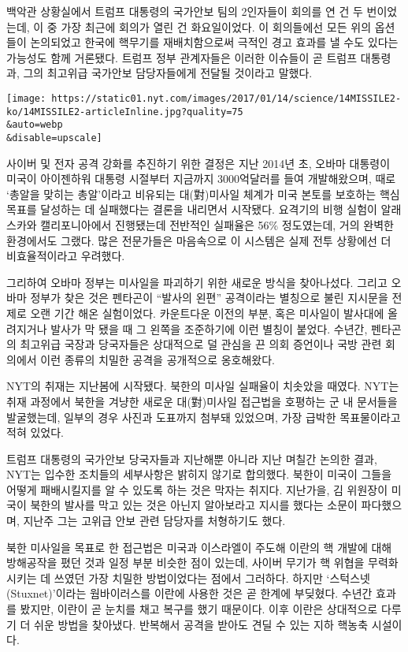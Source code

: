 백악관 상황실에서 트럼프 대통령의 국가안보 팀의 2인자들이 회의를 연 건
두 번이었는데, 이 중 가장 최근에 회의가 열린 건 화요일이었다. 이
회의들에선 모든 위의 옵션들이 논의되었고 한국에 핵무기를 재배치함으로써
극적인 경고 효과를 낼 수도 있다는 가능성도 함께 거론됐다. 트럼프 정부
관계자들은 이러한 이슈들이 곧 트럼프 대통령과, 그의 최고위급 국가안보
담당자들에게 전달될 것이라고 말했다.

\texttt{[image: https://static01.nyt.com/images/2017/01/14/science/14MISSILE2-ko/14MISSILE2-articleInline.jpg?quality=75\\\&auto=webp\\\&disable=upscale]}

사이버 및 전자 공격 강화를 추진하기 위한 결정은 지난 2014년 초, 오바마
대통령이 미국이 아이젠하워 대통령 시절부터 지금까지 3000억달러를 들여
개발해왔으며, 때로 `총알을 맞히는 총알'이라고 비유되는 대(對)미사일
체계가 미국 본토를 보호하는 핵심 목표를 달성하는 데 실패했다는 결론을
내리면서 시작됐다. 요격기의 비행 실험이 알래스카와 캘리포니아에서
진행됐는데 전반적인 실패율은 56\% 정도였는데, 거의 완벽한 환경에서도
그랬다. 많은 전문가들은 마음속으로 이 시스템은 실제 전투 상황에선 더
비효율적이라고 우려했다.

그리하여 오바마 정부는 미사일을 파괴하기 위한 새로운 방식을 찾아나섰다.
그리고 오바마 정부가 찾은 것은 펜타곤이 ``발사의 왼편'' 공격이라는
별칭으로 불린 지시문을 전제로 오랜 기간 해온 실험이었다. 카운트다운
이전의 부분, 혹은 미사일이 발사대에 올려지거나 발사가 막 됐을 때 그
왼쪽을 조준하기에 이런 별칭이 붙었다. 수년간, 펜타곤의 최고위급 국장과
당국자들은 상대적으로 덜 관심을 끈 의회 증언이나 국방 관련 회의에서 이런
종류의 치밀한 공격을 공개적으로 옹호해왔다.

NYT의 취재는 지난봄에 시작됐다. 북한의 미사일 실패율이 치솟았을 때였다.
NYT는 취재 과정에서 북한을 겨냥한 새로운 대(對)미사일 접근법을 호평하는
군 내 문서들을 발굴했는데, 일부의 경우 사진과 도표까지 첨부돼 있었으며,
가장 급박한 목표물이라고 적혀 있었다.

트럼프 대통령의 국가안보 당국자들과 지난해뿐 아니라 지난 며칠간 논의한
결과, NYT는 입수한 조치들의 세부사항은 밝히지 않기로 합의했다. 북한이
미국이 그들을 어떻게 패배시킬지를 알 수 있도록 하는 것은 막자는 취지다.
지난가을, 김 위원장이 미국이 북한의 발사를 막고 있는 것은 아닌지
알아보라고 지시를 했다는 소문이 파다했으며, 지난주 그는 고위급 안보 관련
담당자를 처형하기도 했다.

북한 미사일을 목표로 한 접근법은 미국과 이스라엘이 주도해 이란의 핵
개발에 대해 방해공작을 폈던 것과 일정 부분 비슷한 점이 있는데, 사이버
무기가 핵 위협을 무력화시키는 데 쓰였던 가장 치밀한 방법이었다는 점에서
그러하다. 하지만 `스턱스넷(Stuxnet)'이라는 웜바이러스를 이란에 사용한
것은 곧 한계에 부딪혔다. 수년간 효과를 봤지만, 이란이 곧 눈치를 채고
복구를 했기 때문이다. 이후 이란은 상대적으로 다루기 더 쉬운 방법을
찾아냈다. 반복해서 공격을 받아도 견딜 수 있는 지하 핵농축 시설이다.

